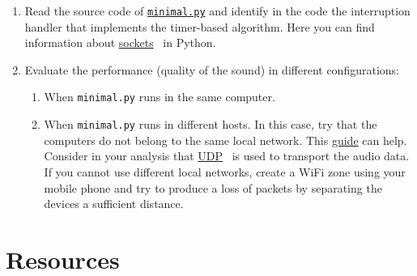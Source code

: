 \begin{enumerate}

\item Read the source code of
  \href{https://github.com/Tecnologias-multimedia/intercom/blob/master/src/minimal.py}{\texttt{minimal.py}}
  and identify in the code the interruption handler that implements
  the timer-based algorithm. Here you can find information about
  \href{https://github.com/vicente-gonzalez-ruiz/YAPT/blob/master/03-IO/networking/sockets.ipynb}{sockets}~\cite{YAPT} in Python.
  
\item Evaluate the performance (quality of the sound) in different configurations:
  \begin{enumerate}
  \item When \verb|minimal.py| runs in the same computer.
  \item When \verb|minimal.py| runs in different hosts. In this case,
    try that the computers do not belong to the same local
    network. This
    \href{https://www.noip.com/support/knowledgebase/general-port-forwarding-guide/}{guide}
    can help. Consider in your analysis that
    \href{https://en.wikipedia.org/wiki/User_Datagram_Protocol}{UDP}~\cite{UDP}
    is used to transport the audio data. If you cannot use different
    local networks, create a WiFi zone using your mobile phone and try
    to produce a loss of packets by separating the devices a
    sufficient distance.
  \end{enumerate}
\end{enumerate}

\section{Resources}


